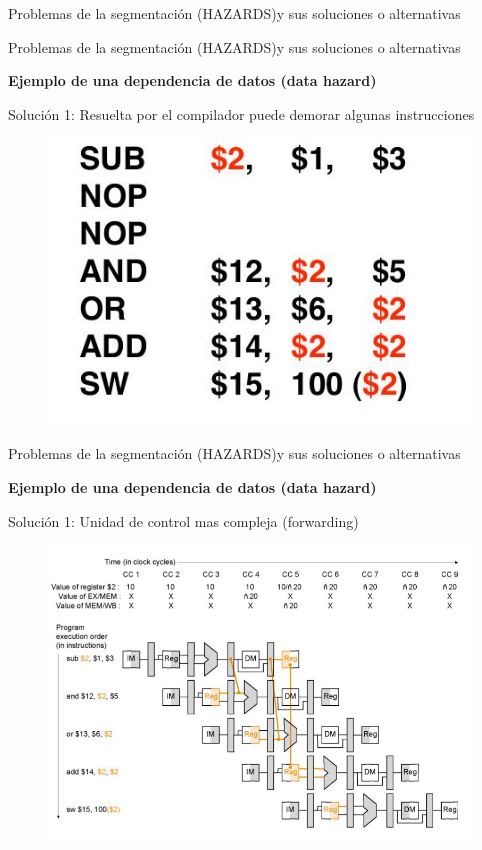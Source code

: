 \documentclass[aspectratio=169,compress]{beamer}
\begin{document}
\begin{footnotesize}
\begin{frame}{Problemas de la segmentación (HAZARDS)}{y sus soluciones o alternativas}
\end{frame}



\begin{frame}{Problemas de la segmentación (HAZARDS)}{y sus soluciones o alternativas}
\begin{center}\textbf{Ejemplo de una dependencia de datos (data hazard)}\end{center}
Solución 1: Resuelta por el compilador puede demorar algunas instrucciones
\begin{figure}
\includegraphics[scale=0.35]{images/pipeling-hazard3.jpg} 
\end{figure}

\end{frame}


\begin{frame}{Problemas de la segmentación (HAZARDS)}{y sus soluciones o alternativas}
\begin{center}\textbf{Ejemplo de una dependencia de datos (data hazard)}\end{center}
Solución 1: Unidad de control mas compleja (forwarding)
\begin{figure}
\includegraphics[scale=0.35]{images/pipeling-hazard4.jpg} 
\end{figure}


\end{frame}
\end{footnotesize}
\end{document}
